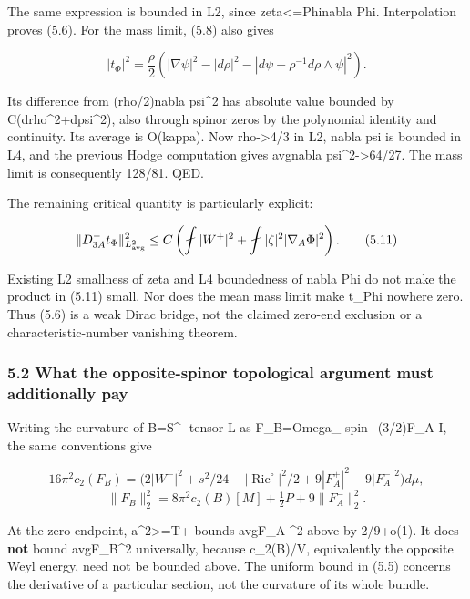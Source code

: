 \documentclass[
  10pt,
]{article}
\begin{document}
The same expression is bounded in L2, since
\textbar zeta\textbar\textless=\textbar Phi\textbar\textbar nabla
Phi\textbar. Interpolation proves (5.6). For the mass limit, (5.8) also
gives

\[
 |t_\Phi|^2=\frac\rho2\left(|\nabla\psi|^2-|d\rho|^2
                -|d\psi-\rho^{-1}d\rho\wedge\psi|^2\right).
\]

Its difference from (rho/2)\textbar nabla psi\textbar\^{}2 has absolute
value bounded by
C(\textbar drho\textbar\^{}2+\textbar dpsi\textbar\^{}2), also through
spinor zeros by the polynomial identity and continuity. Its average is
O(kappa). Now rho-\textgreater4/3 in L2, nabla psi is bounded in L4, and
the previous Hodge computation gives avg\textbar nabla
psi\textbar\^{}2-\textgreater64/27. The mass limit is consequently
128/81. QED.

The remaining critical quantity is particularly explicit:

\[
 \|D^-_{3A}t_\Phi\|_{L^2_{\rm avg}}^2
 \le C\left(\fint|W^+|^2+
               \fint|\zeta|^2|\nabla_A\Phi|^2\right).   \tag{5.11}
\]

Existing L2 smallness of zeta and L4 boundedness of nabla Phi do not
make the product in (5.11) small. Nor does the mean mass limit make
t\_Phi nowhere zero. Thus (5.6) is a weak Dirac bridge, not the claimed
zero-end exclusion or a characteristic-number vanishing theorem.

\hypertarget{what-the-opposite-spinor-topological-argument-must-additionally-pay}{%
\subsubsection{5.2 What the opposite-spinor topological argument must
additionally
pay}\label{what-the-opposite-spinor-topological-argument-must-additionally-pay}}

Writing the curvature of B=S\^{}- tensor L as
F\_B=Omega\_-spin+(3/2)F\_A I, the same conventions give

\[
 16\pi^2c_2(F_B)=\bigl(2|W^-|^2+s^2/24-|\operatorname{Ric}^\circ|^2/2
                     +9|F_A^+|^2-9|F_A^-|^2\bigr)d\mu,
\] \[
 \|F_B\|_2^2=8\pi^2c_2(B)[M]+\tfrac12P+9\|F_A^-\|_2^2. \tag{5.12}
\]

At the zero endpoint, a\^{}2\textgreater=T+ bounds
avg\textbar F\_A-\textbar\^{}2 above by 2/9+o(1). It does \textbf{not}
bound avg\textbar F\_B\textbar\^{}2 universally, because c\_2(B)/V,
equivalently the opposite Weyl energy, need not be bounded above. The
uniform bound in (5.5) concerns the derivative of a particular section,
not the curvature of its whole bundle.
\end{document}
